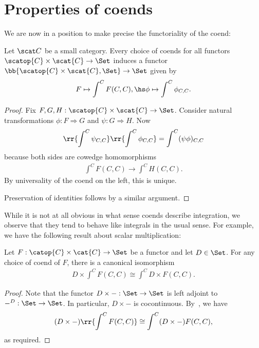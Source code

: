 \section{Properties of coends}

We are now in a position to make precise the functoriality of the coend:

\begin{lemma}\label{lemma:functoriality_of_coends}
  Let $\scat C$ be a small category.
  Every choice of coends for all functors $\scatop{C}\times\scat{C}\to\Set$ induces
  a functor $\bb{\scatop{C}\times\scat{C},\Set}\to\Set$ given by
  \begin{align*}
    F \mapsto \int^C F(C,C), \hs \phi \mapsto \int^C \phi_{C,C}.
  \end{align*}
  \begin{proof}
    Fix $F,G,H:\scatop{C}\times\scat{C}\to\Set$. Consider natural
    transformations $\phi:F\Rightarrow G$ and $\psi:G\Rightarrow H$. Now
    \begin{align*}
      \rr{\int^C \psi_{C,C}}\rr{\int^C \phi_{C,C}} = \int^C (\psi\phi)_{C,C}
    \end{align*}
    because both sides are cowedge homomorphisms
    \begin{align*}
      \int^C F(C,C) \to \int^C H(C,C).
    \end{align*}
    By universality of the coend on the left, this is unique.

    Preservation of identities follows by a similar argument.
  \end{proof}
\end{lemma}

While it is not at all obvious in what sense coends describe integration, we
observe that they tend to behave like integrals in the usual sense. For
example, we have the following result about scalar multiplication:

\begin{lemma}\label{lemma:scalar_multiplication_of_coends}
  Let $F:\catop{C}\times\cat{C}\to\Set$ be a functor
  and let $D\in\Set$. For any choice of coend of $F$, there is a canonical isomorphism
  \begin{align*}
    D\times \int^{C} F(C,C) \cong \int^{C} D\times F(C,C).
  \end{align*}
  \begin{proof}
    Note that the functor $D\times -:\Set\to\Set$ is left adjoint to
    $-^D:\Set\to\Set$. In particular, $D\times -$ is cocontinuous.
    By~\cite[Theorem 1.2.7]{loregian2015}, we have
    \begin{align*}
      (D\times -)\rr{\int^C F(C,C)} \cong \int^C (D\times -)F(C,C),
    \end{align*}
    as required.
  \end{proof}
\end{lemma}

